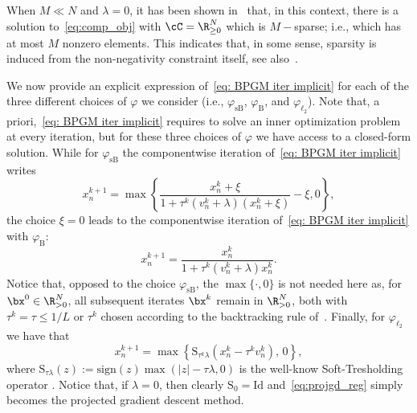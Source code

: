 \documentclass[11pt]{amsart}
\newcommand{\es}[1]{{\color{blue}#1}}
\newcommand{\cd}[1]{{\color{orange}#1}}
\begin{document}
\begin{remark}\label{rem:implicit_reg}
     When $M\ll N$ and $\lambda=0$, it has been shown in~\cite[Proposition 1]{Boyer2019} that, in this context, there is a solution to~\cref{eq:comp_obj} with $\cC = \R_{\geq 0}^N$ which is $M-$sparse; i.e., which has at most $M$ nonzero elements. This indicates that, in some sense, sparsity is induced from the non-negativity constraint itself, see also~\cite{Donoho2005}.
\end{remark}


We now provide an explicit expression of~\cref{eq: BPGM iter implicit} for each of the three different choices of $\varphi$ we consider (i.e., $\varphi_\mathrm{sB}$, $\varphi_\mathrm{B}$, and $\varphi_{\ell_2}$). Note that, a priori,~\cref{eq: BPGM iter implicit} requires to solve an inner optimization problem at every iteration, but for these three choices of $\varphi$ we have access to a closed-form solution. While for $\varphi_{\mathrm{sB}}$ the componentwise iteration of~\cref{eq: BPGM iter implicit} writes
\begin{equation}\label{iter with sBurg}
x^{k+1}_n=\max\left\{\frac{x_n^k+\xi}{1+\tau^k (v_n^k+\lambda)(x_n^k+\xi)}-\xi, 0\right\},
\end{equation}
the choice $\xi=0$ leads to the componentwise iteration of~\cref{eq: BPGM iter implicit} with $\varphi_{\mathrm{B}}$: 
\begin{equation}\label{iter with Burg}
x^{k+1}_n=\frac{x_n^k}{1+\tau^k (v_n^k+\lambda)x_n^k}.
\end{equation}
Notice that, opposed to the choice $\varphi_{\mathrm{sB}}$, the $\max\{\cdot, 0\}$ is not needed here as, for $\bx^0\in\R_{>0}^N$, all subsequent iterates $\bx^k$ remain in $\R_{>0}^N$, both with $\tau^k=\tau\leq 1/L$ 
or $\tau^k$ chosen according to the backtracking rule of~. Finally, for $\varphi_{\ell_2}$ we have that
\begin{equation}\label{eq:projgd_reg}
        x^{k+1}_n = \max \left\{\mathrm{S}_{\tau^k \lambda} (x^{k}_n - \tau^k v_n^k), \, 0 \right\},
\end{equation}
where $\mathrm{S}_{\tau \lambda}(z):= \text{sign}(z) \max(|z| - \tau \lambda, 0)$ is the well-know Soft-Tresholding operator \cite{daubechies2004iterative}. Notice that, if $\lambda=0$, then clearly $\mathrm{S}_{0}=\mathrm{Id}$ and~\cref{eq:projgd_reg} simply becomes the projected gradient descent method. 
\end{document}
